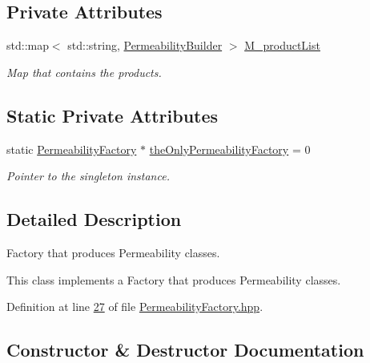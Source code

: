 \subsection*{Private Attributes}
\begin{DoxyCompactItemize}
\item 
std\+::map$<$ std\+::string, \hyperlink{namespaceFVCode3D_ad92e05ac4c0491bab1c45e5457d2518c}{Permeability\+Builder} $>$ \hyperlink{classFVCode3D_1_1PermeabilityFactory_a929e4768d02b4d006e8b2ace9dcc2354}{M\+\_\+product\+List}
\begin{DoxyCompactList}\small\item\em Map that contains the products. \end{DoxyCompactList}\end{DoxyCompactItemize}
\subsection*{Static Private Attributes}
\begin{DoxyCompactItemize}
\item 
static \hyperlink{classFVCode3D_1_1PermeabilityFactory}{Permeability\+Factory} $\ast$ \hyperlink{classFVCode3D_1_1PermeabilityFactory_af47631ea4362556dd4240314e5e056b7}{the\+Only\+Permeability\+Factory} = 0
\begin{DoxyCompactList}\small\item\em Pointer to the singleton instance. \end{DoxyCompactList}\end{DoxyCompactItemize}


\subsection{Detailed Description}
Factory that produces Permeability classes. 

This class implements a Factory that produces Permeability classes. 

Definition at line \hyperlink{PermeabilityFactory_8hpp_source_l00027}{27} of file \hyperlink{PermeabilityFactory_8hpp_source}{Permeability\+Factory.\+hpp}.



\subsection{Constructor \& Destructor Documentation}
